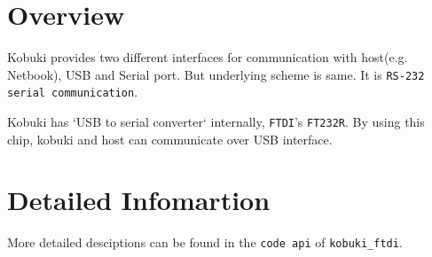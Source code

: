 \section{\-Overview}\label{enFtdiGuide_ftdiOverview}
\-Kobuki provides two different interfaces for communication with host(e.\-g. \-Netbook), \-U\-S\-B and \-Serial port. \-But underlying scheme is same. \-It is {\tt \-R\-S-\/232} {\tt serial communication}.

\-Kobuki has `\-U\-S\-B to serial converter` internally, {\tt \-F\-T\-D\-I}'s {\tt \-F\-T232\-R}. \-By using this chip, kobuki and host can communicate over \-U\-S\-B interface.\section{\-Detailed Infomartion}\label{enFtdiGuide_ftdiDetailedInformation}
\-More detailed desciptions can be found in the {\tt code api} of {\tt kobuki\-\_\-ftdi}. 